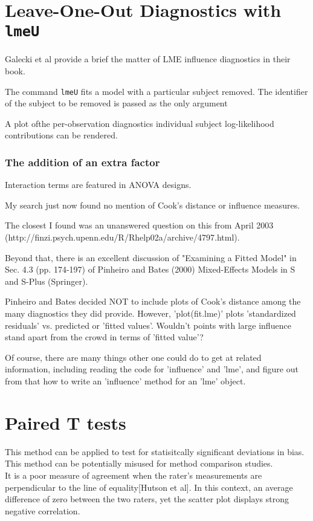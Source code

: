 \documentclass[12pt, a4paper]{report}
\theoremstyle{plain}
\theoremstyle{definition}
\theoremstyle{remark}
\begin{document}

\section*{Leave-One-Out Diagnostics with \texttt{lmeU}}
Galecki et al provide a brief the matter of LME influence diagnostics in their book.

The command \texttt{lmeU} fits a model with a particular subject removed. The identifier of the subject to be removed is passed as the only argument

A plot ofthe per-observation diagnostics individual subject log-likelihood contributions can be rendered.

\subsubsection*{The addition of an extra factor}




Interaction terms are featured in ANOVA designs.

My search just now found no mention of Cook's distance or influence measures.  

The closest I found was an unanswered question on this from 
April 2003 (http://finzi.psych.upenn.edu/R/Rhelp02a/archive/4797.html).

Beyond that, there is an excellent discussion of "Examining a Fitted Model" in Sec. 4.3 (pp. 174-197) of Pinheiro and Bates (2000) 
Mixed-Effects Models in S and S-Plus (Springer).  

Pinheiro and Bates decided NOT to include plots of Cook's distance among the many diagnostics they did provide.  
However, 'plot(fit.lme)' plots 'standardized residuals' vs. predicted or 'fitted values'.  
Wouldn't points with large influence stand apart from the crowd in terms of 'fitted value'?

Of course, there are many things other one could do to get at related information, including reading the code for 'influence' and 'lme', and 
figure out from that how to write an 'influence' method for an 'lme' object. 



\section{Paired T tests}
This method can be applied to test for statisitcally significant
deviations in bias. This method can be potentially misused for
method comparison studies.
\\It is a poor measure of agreement when the rater's measurements
are perpendicular to the line of equality[Hutson et al]. In this
context, an average difference of zero between the two raters, yet
the scatter plot displays strong negative correlation.
\end{document}
